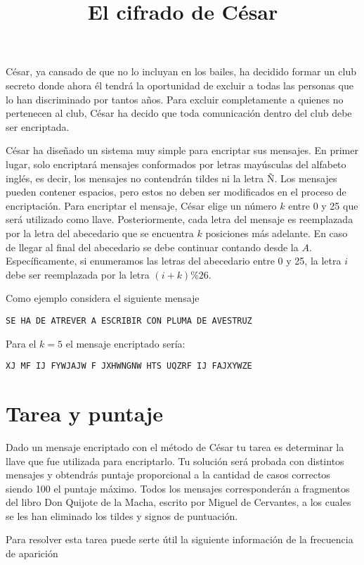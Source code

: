 \documentclass{oci}
\title{El cifrado de César}
\newcommand{\todo}[1]{{\color{red}{#1}}}
\begin{document}
\begin{problemDescription}
César, ya cansado de que no lo incluyan en los bailes, ha decidido formar un club secreto
donde ahora él tendrá la oportunidad de excluir a todas las personas que lo han discriminado por
tantos años.
Para excluir completamente a quienes no pertenecen al club, César ha decido que toda comunicación
dentro del club debe ser encriptada.

César ha diseñado un sistema muy simple para encriptar sus mensajes.
En primer lugar, solo encriptará mensajes conformados por letras mayúsculas del alfabeto
inglés, es decir, los mensajes no contendrán tildes ni la letra Ñ.
Los mensajes pueden contener espacios, pero estos no deben ser modificados en el proceso de
encriptación.
Para encriptar el mensaje, César elige un número $k$ entre 0 y 25 que será utilizado como llave.
Posteriormente, cada letra del mensaje es reemplazada por la letra del abecedario que se
encuentra $k$ posiciones más adelante.
En caso de llegar al final del abecedario se debe continuar contando desde la $A$.
Específicamente, si enumeramos las letras del abecedario entre 0 y 25, la letra $i$ debe ser
reemplazada por la letra $(i+k)\% 26$.

Como ejemplo considera el siguiente mensaje
\begin{center}
  \texttt{SE HA DE ATREVER A ESCRIBIR CON PLUMA DE AVESTRUZ}
\end{center}
Para el $k=5$ el mensaje encriptado sería:
\begin{center}
  \texttt{XJ MF IJ FYWJAJW F JXHWNGNW HTS UQZRF IJ FAJXYWZE}
\end{center}

\end{problemDescription}

\section*{Tarea y puntaje}
Dado un mensaje encriptado con el método de César tu tarea es determinar la llave que fue
utilizada para encriptarlo.
Tu solución será probada con distintos mensajes y obtendrás puntaje proporcional a la cantidad
de casos correctos siendo 100 el puntaje máximo.
Todos los mensajes corresponderán a fragmentos del libro Don Quijote de la Macha, escrito
por Miguel de Cervantes, a los cuales se les han eliminado los tildes y signos de puntuación.

Para resolver esta tarea puede serte útil la siguiente información de la frecuencia de aparición
\todo{fill with stats}
\end{document}
